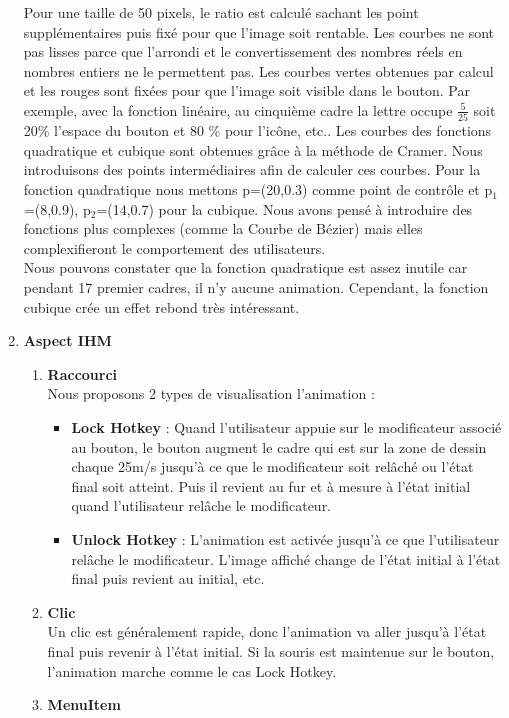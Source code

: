 \documentclass[12pt,a4paper]{article}
\begin{document}
\begin{enumerate}
Pour une taille de 50 pixels, le ratio est calculé sachant les point supplémentaires puis fixé pour que l'image soit rentable.
Les courbes ne sont pas lisses parce que l'arrondi et le convertissement des nombres réels en nombres entiers ne le permettent pas. Les courbes vertes obtenues par calcul et les rouges sont fixées pour que l'image soit visible dans le bouton. Par exemple, avec la fonction linéaire, au cinquième cadre la lettre occupe $\frac{5}{25}$ soit 20\% l'espace du bouton et 80 \% pour l'icône, etc.. Les courbes des fonctions quadratique et cubique sont obtenues grâce à la méthode de Cramer. Nous introduisons des points intermédiaires afin de calculer ces courbes. Pour la fonction quadratique nous mettons p=(20,0.3) comme point de contrôle et p$_1$=(8,0.9), p$_2$=(14,0.7) pour la cubique.
Nous avons pensé à introduire des fonctions plus complexes (comme la Courbe de Bézier) mais elles complexifieront le comportement des utilisateurs.\\
Nous pouvons constater que la fonction quadratique est assez inutile car pendant 17 premier cadres, il n'y aucune animation. Cependant, la fonction cubique crée un effet rebond très intéressant.
\item {\large \textbf{Aspect IHM}}\\
\begin{enumerate}
\item {\large \textbf{Raccourci}}\\
Nous proposons 2 types de visualisation l'animation :
\begin{itemize}
\item \textbf{Lock Hotkey} : Quand l'utilisateur appuie sur le modificateur associé au bouton, le bouton augment le cadre qui est sur la zone de dessin chaque 25m/s jusqu'à ce que le modificateur soit relâché ou l'état final soit atteint. Puis il revient au fur et à mesure à l'état initial quand l'utilisateur relâche le modificateur.
\item \textbf{Unlock Hotkey} : L'animation est activée jusqu'à ce que l'utilisateur relâche le modificateur. L'image affiché change de l'état initial à l'état final puis revient au initial, etc.
\end{itemize}
\item {\large \textbf{Clic}}\\
Un clic est généralement rapide, donc l'animation va aller jusqu'à l'état final puis revenir à l'état initial. Si la souris est maintenue sur le bouton, l'animation marche comme le cas Lock Hotkey.
\item {\large \textbf{MenuItem}}\\

\end{enumerate}
\end{enumerate}
\end{document}
